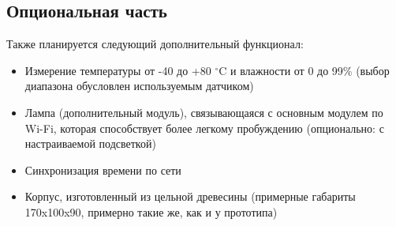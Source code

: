 \documentclass[a4paper,14pt]{extarticle}
\begin{document}
\subsection{Опциональная часть}

Также планируется следующий дополнительный функционал:
\begin{itemize}
	\item
		Измерение температуры от -40 до +80 $^\circ$C
		и влажности от 0 до 99\% (выбор диапазона обусловлен
		используемым датчиком)
	\item
		Лампа (дополнительный модуль), связывающаяся с 
		основным модулем по Wi-Fi, которая способствует
		более легкому пробуждению (опционально: с настраиваемой
		подсветкой)
	\item
		Синхронизация времени по сети
	\item
		Корпус, изготовленный из цельной древесины 
		(примерные габариты 170x100x90, примерно такие же, как и у прототипа)
\end{itemize}




\end{document}
